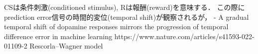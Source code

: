CSは条件刺激(conditioned stimulus), Rは報酬(reward)を意味する．
この際にprediction error信号の時間的変位(temporal shift)が観察されるが，
- A gradual temporal shift of dopamine responses mirrors the progression of temporal difference error in machine learning
https://www.nature.com/articles/s41593-022-01109-2
Rescorla–Wagner model